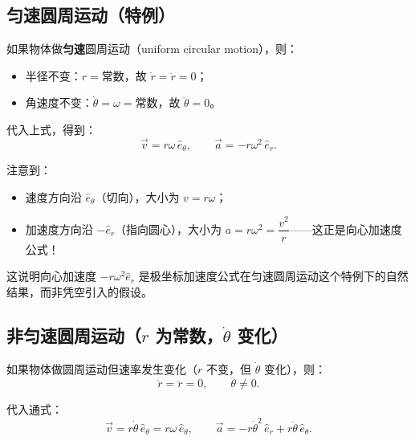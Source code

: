 \documentclass[12pt,a4paper]{article}
\begin{document}
\begin{center}
\end{center}

\subsection{匀速圆周运动（特例）}

如果物体做\textbf{匀速}圆周运动（uniform circular motion），则：
\begin{itemize}
  \item 半径不变：$r = \text{常数}$，故 $\dot{r} = \ddot{r} = 0$；
  \item 角速度不变：$\dot{\theta} = \omega = \text{常数}$，故 $\ddot{\theta} = 0$。
\end{itemize}

代入上式，得到：
\[
\vec{v} = r\omega\,\hat{e}_\theta,\qquad
\vec{a} = -r\omega^2\,\hat{e}_r.
\]

注意到：
\begin{itemize}
  \item 速度方向沿 $\hat{e}_\theta$（切向），大小为 $v = r\omega$；
  \item 加速度方向沿 $-\hat{e}_r$（指向圆心），大小为 $a = r\omega^2 = \dfrac{v^2}{r}$——这正是向心加速度公式！
\end{itemize}

这说明向心加速度 $-r\omega^2\hat{e}_r$ 是极坐标加速度公式在匀速圆周运动这个特例下的自然结果，而非凭空引入的假设。

\subsection{非匀速圆周运动（$r$ 为常数，$\dot{\theta}$ 变化）}

如果物体做圆周运动但速率发生变化（$r$ 不变，但 $\dot{\theta}$ 变化），则：
\[
\dot{r} = \ddot{r} = 0,\qquad \ddot{\theta} \neq 0.
\]

代入通式：
\[
\vec{v} = r\dot{\theta}\,\hat{e}_\theta = r\omega\,\hat{e}_\theta,\qquad
\vec{a} = -r\dot{\theta}^2\,\hat{e}_r + r\ddot{\theta}\,\hat{e}_\theta.
\]
\end{document}
